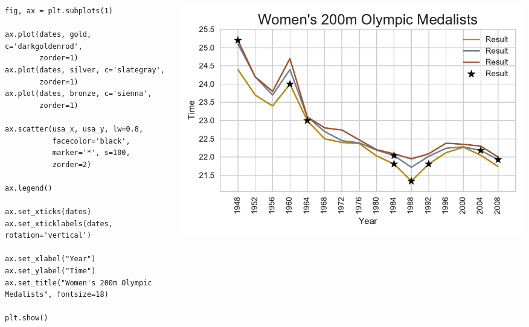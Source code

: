 \documentclass{beamer}
\begin{document}
\begin{frame}[fragile]
\tiny{
\begin{columns}
\begin{column}{0.45\textwidth}
\begin{verbatim}
fig, ax = plt.subplots(1)

ax.plot(dates, gold, c='darkgoldenrod',
        zorder=1)
ax.plot(dates, silver, c='slategray',
        zorder=1)
ax.plot(dates, bronze, c='sienna',
        zorder=1)

ax.scatter(usa_x, usa_y, lw=0.8,
           facecolor='black',
           marker='*', s=100,
           zorder=2)

ax.legend()

ax.set_xticks(dates)
ax.set_xticklabels(dates, rotation='vertical')

ax.set_xlabel("Year")
ax.set_ylabel("Time")
ax.set_title("Women's 200m Olympic Medalists", fontsize=18)

plt.show()
\end{verbatim}
\end{column}
\begin{column}{0.55\textwidth}
\includegraphics[width=\textwidth]{olympics_7.pdf}
\end{column}
\end{columns}
}
\end{frame}
\end{document}

